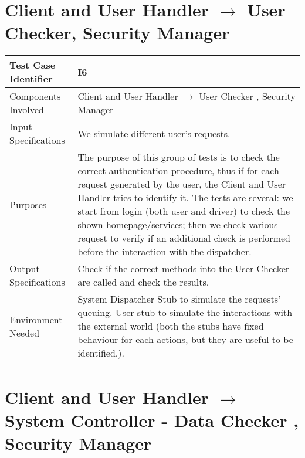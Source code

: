 \documentclass[\mainpath/main]{subfiles}
\begin{document}
\section{Client and User Handler $\rightarrow$ User Checker, Security Manager}

\begin{tabular}[!ht]{l@{\hspace{1cm}}p{8.5cm}}
	\hline  Test Case Identifier & I6\\ 
	\hline  Components Involved & Client and User Handler $\rightarrow$ User Checker , Security Manager\\ 
	\hline  Input Specifications & We simulate different user's requests.\\ 
	\hline  Purposes & The purpose of this group of tests is to check the correct authentication procedure, thus if for each request generated by the user, the Client and User Handler tries to identify it. The tests are several: we start from login (both user and driver) to check the shown homepage/services; then we check various request to verify if an additional check is performed before the interaction with the dispatcher.\\
	\hline  Output Specifications & Check if the correct methods into the User Checker are called and check the results.\\ 
	\hline  Environment Needed & System Dispatcher Stub to simulate the requests' queuing. User stub to simulate the interactions with the external world (both the stubs have fixed behaviour for each actions, but they are useful to be identified.). \\ 
	\hline 
\end{tabular} 

\section{Client and User Handler $\rightarrow$ System Controller - Data Checker , Security Manager}
\end{document}
